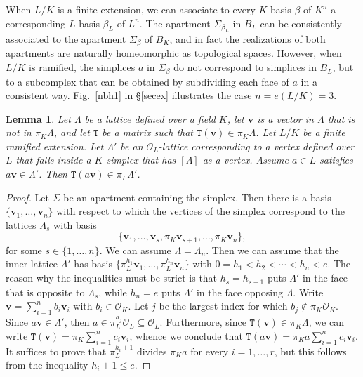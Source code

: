 \documentclass{article}
\newtheorem{lem}[prop]{Lemma}
\theoremstyle{definition}
\begin{document}
When $L/K$ is a finite extension, we can associate to every
$K$-basis $\beta$ of $K^n$ a corresponding $L$-basis $\beta_L$
of $L^n$. The apartment $\Sigma_{\beta_L}$ in $B_L$
can be consistently associated to the apartment $\Sigma_\beta$
of $B_K$, and in fact the realizations of both apartments
are naturally homeomorphic as topological spaces. However, when $L/K$
is ramified, the simplices $a$ in $\Sigma_\beta$ do not correspond
to simplices in $B_L$, but to a subcomplex that can be obtained
by subdividing each face of $a$ in a consistent way.
Fig.~\ref{nbh1} in \S\ref{secex} illustrates the case
$n=e(L/K)=3$.

\begin{lem}\label{vint}
    Let $\Lambda$ be a lattice defined over a field
    $K$, let $\mathbf{v}$ is a vector in $\Lambda$ that
    is not in $\pi_K\Lambda$, and let $\mathtt{T}$ be a matrix 
    such that $\mathtt{T}(\mathbf{v})\in\pi_K\Lambda$.
    Let $L/K$ be a finite ramified extension.
    Let $\Lambda'$ be an $\mathcal{O}_L$-lattice 
    corresponding to a vertex defined over $L$
    that falls inside a $K$-simplex that has $[\Lambda]$
    as a vertex. Assume $a\in L$ satisfies  
    $a\mathbf{v}\in\Lambda'$.
    Then $\mathtt{T}(a\mathbf{v})\in\pi_L\Lambda'$.
\end{lem}

\begin{proof}
    Let $\Sigma$ be an apartment containing the simplex. 
    Then there is a basis $\{\mathbf{v}_1,\dots,\mathbf{v}_n\}$ 
    with respect to which the vertices of the simplex 
    correspond to the lattices $\Lambda_s$ with basis 
    $$\{\mathbf{v}_1,\dots,\mathbf{v}_s,\pi_K\mathbf{v}_{s+1},
    \dots,\pi_K\mathbf{v}_n\},$$ for some $s\in\{1,\dots,n\}$.
    We can assume $\Lambda=\Lambda_n$. Then we can assume that
     the inner lattice
     $\Lambda'$ has basis $\{\pi_L^{h_1}\mathbf{v}_1,\dots,
     \pi_L^{h_n}\mathbf{v}_n\}$ with $0=h_1<h_2<\cdots<h_n<e$.
     The reason why the inequalities must be strict is that
     $h_s=h_{s+1}$ puts $\Lambda'$ in the face that is opposite
     to $\Lambda_s$, while $h_n=e$ puts $\Lambda'$ in the face 
     opposing $\Lambda$. Write $\mathbf{v}=
     \sum_{i=1}^nb_i\mathbf{v}_i$ with $b_i\in\mathcal{O}_K$. 
     Let $j$ be the largest index
     for which $b_j\notin\pi_K\mathcal{O}_K$. Since 
     $a\mathbf{v}\in\Lambda'$, then $a\in\pi_L^{h_j}\mathcal{O}_L
     \subseteq\mathcal{O}_L$. Furthermore,
     since $\mathtt{T}(\mathbf{v})\in\pi_K\Lambda$, we can
     write $\mathtt{T}(\mathbf{v})=
     \pi_K\sum_{i=1}^nc_i\mathbf{v}_i$, whence we conclude that
     $\mathtt{T}(a\mathbf{v})=
     \pi_Ka\sum_{i=1}^nc_i\mathbf{v}_i$.
     It suffices to prove that $\pi_L^{h_i+1}$ divides $\pi_Ka$
     for every $i=1,\dots,r$, but this follows from
     the inequality $h_i+1\leq e$.
\end{proof}
\end{document}
